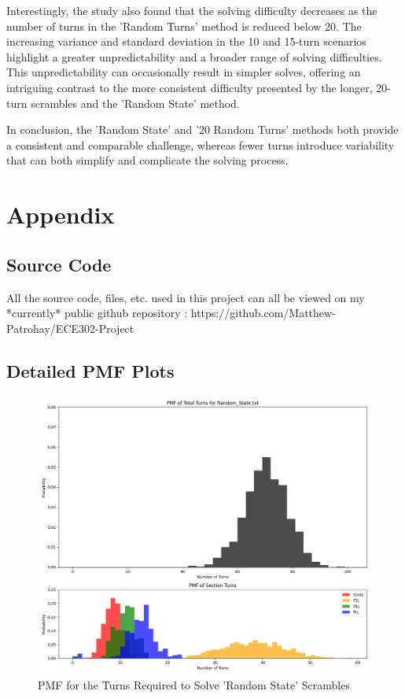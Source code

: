 \documentclass[12pt,letterpaper]{article}
\numberwithin{equation}{section}
\begin{document}
Interestingly, the study also found that the solving difficulty decreases as the number of turns in the 'Random Turns' method is reduced below 20. The increasing variance and standard deviation in the 10 and 15-turn scenarios highlight a greater unpredictability and a broader range of solving difficulties. This unpredictability can occasionally result in simpler solves, offering an intriguing contrast to the more consistent difficulty presented by the longer, 20-turn scrambles and the 'Random State' method.

In conclusion, the 'Random State' and '20 Random Turns' methods both provide a consistent and comparable challenge, whereas fewer turns introduce variability that can both simplify and complicate the solving process.













\newpage


\section{Appendix}

\subsection{Source Code}

All the source code, files, etc. used in this project can all be viewed on my *currently* public github repository : https://github.com/Matthew-Patrohay/ECE302-Project

\subsection{Detailed PMF Plots}

	\begin{figure}[H]
		\centering
		 \includegraphics[width=6in]{pmf_random_state.png}
		 \caption{PMF for the Turns Required to Solve 'Random State' Scrambles}
		 \label{fig:pmf_random_state}
	\end{figure}
	
\end{document}
